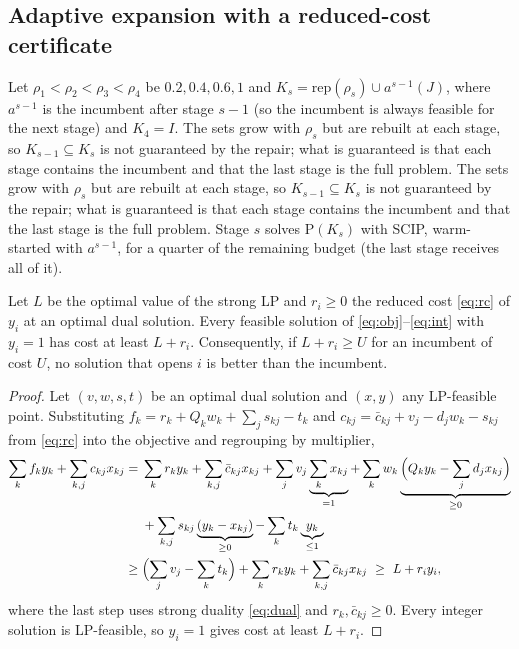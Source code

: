 \subsection{Adaptive expansion with a reduced-cost certificate}\label{sec:expansion}
Let $\rho_1<\rho_2<\rho_3<\rho_4$ be $0.2,0.4,0.6,1$ and $K_s=\mathrm{rep}(\rho_s)\cup a^{s-1}(J)$,
where $a^{s-1}$ is the incumbent after stage $s-1$ (so the incumbent is always feasible for the
next stage) and $K_4=I$. The sets grow with $\rho_s$ but are rebuilt at each stage, so
$K_{s-1}\subseteq K_s$ is not guaranteed by the repair; what is guaranteed is that each stage
contains the incumbent and that the last stage is the full problem. The sets grow with $\rho_s$ but are rebuilt at each stage, so
$K_{s-1}\subseteq K_s$ is not guaranteed by the repair; what is guaranteed is that each stage
contains the incumbent and that the last stage is the full problem. Stage $s$ solves $\mathrm{P}(K_s)$ with SCIP, warm-started with
$a^{s-1}$, for a quarter of the remaining budget (the last stage receives all of it).

\begin{proposition}\label{prop:rc}
Let $L$ be the optimal value of the strong LP and $r_i\ge0$ the reduced cost \eqref{eq:rc} of
$y_i$ at an optimal dual solution. Every feasible solution of
\eqref{eq:obj}--\eqref{eq:int} with $y_i=1$ has cost at least $L+r_i$. Consequently, if
$L+r_i\ge U$ for an incumbent of cost $U$, no solution that opens $i$ is better than the
incumbent.
\end{proposition}
\begin{proof}
Let $(v,w,s,t)$ be an optimal dual solution and $(x,y)$ any LP-feasible point. Substituting
$f_k=r_k+Q_kw_k+\sum_j s_{kj}-t_k$ and $c_{kj}=\bar c_{kj}+v_j-d_jw_k-s_{kj}$ from \eqref{eq:rc}
into the objective and regrouping by multiplier,
\begin{align*}
\sum_{k} f_k y_k+\sum_{k,j} c_{kj}x_{kj}
={}& \sum_k r_ky_k+\sum_{k,j}\bar c_{kj}x_{kj}+\sum_j v_j\underbrace{\sum_k x_{kj}}_{=1}
+\sum_k w_k\underbrace{\Bigl(Q_ky_k-\sum_j d_jx_{kj}\Bigr)}_{\ge0}\\
&+\sum_{k,j}s_{kj}\underbrace{(y_k-x_{kj})}_{\ge0}-\sum_k t_k\underbrace{y_k}_{\le1}\\
\ge{}& \Bigl(\sum_j v_j-\sum_k t_k\Bigr)+\sum_k r_ky_k+\sum_{k,j}\bar c_{kj}x_{kj}
\ \ge\ L+r_iy_i ,
\end{align*}
where the last step uses strong duality \eqref{eq:dual} and $r_k,\bar c_{kj}\ge0$. Every integer
solution is LP-feasible, so $y_i=1$ gives cost at least $L+r_i$.
\end{proof}

